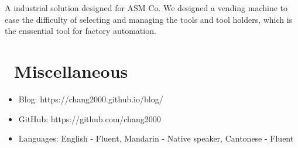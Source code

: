\documentclass{resume}
\begin{document}
A industrial solution designed for ASM Co. We designed a vending machine to ease the difficulty of selecting and 
managing the tools and tool holders, which is the enssential tool for factory automation.

\section{\faInfo\ Miscellaneous}
\begin{itemize}[parsep=0.5ex]
  \item Blog: https://chang2000.github.io/blog/
  \item GitHub: https://github.com/chang2000
  \item Languages: English - Fluent, Mandarin - Native speaker, Cantonese - Fluent
\end{itemize}

%
%
\end{document}
